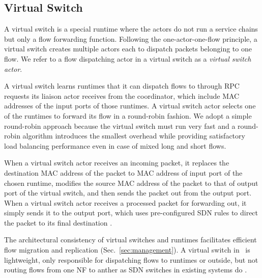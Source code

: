 \subsection{Virtual Switch}
\label{sec:virtualswitch}

A virtual switch is a special runtime where the actors do not run a service chains but only a flow forwarding function. Following the one-actor-one-flow principle, a virtual switch creates multiple actors each to dispatch packets belonging to one flow. We refer to a flow dispatching actor in a virtual switch as a {\em virtual switch actor}.


A virtual switch learns runtimes that it can dispatch flows to through RPC requests its liaison actor receives from the coordinator, which include MAC addresses of the input ports of those runtimes. A virtual switch actor selects one of the runtimes to forward its flow in a round-robin fashion. We adopt a simple round-robin approach because the virtual switch must run very fast and a round-robin algorithm introduces the smallest overhead while providing satisfactory load balancing performance even in case of mixed long and short flows.

When a virtual switch actor receives an incoming packet, it replaces the destination MAC address of the packet to MAC address of input port of the chosen runtime, modifies the source MAC address of the packet to that of output port of the virtual switch, and then sends the packet out from the output port. When a virtual switch actor receives a processed packet for forwarding out, %
 it simply sends it to the output port, which uses pre-configured SDN rules to direct the packet to its final destination .


The architectural consistency of virtual switches and runtimes facilitates efficient flow migration and replication (Sec.~\ref{sec:management}). %
 A virtual switch in \nfactor~is lightweight, only responsible for dispatching flows to runtimes or outside, but not routing flows from one NF to anther as SDN switches in existing systems do \cite{gember2012stratos, gember2015opennf}.


